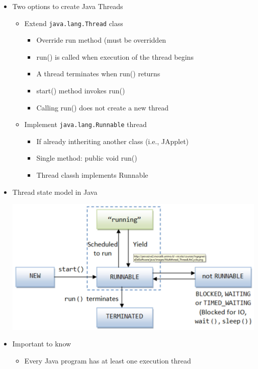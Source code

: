 \documentclass[a4paper]{article}
\newcommand{\inline}[1]{\lstinline!#1!}%
\begin{document}
\begin{itemize}
\begin{center}
			\end{center}
		\item Two options to create Java Threads
			\begin{itemize}
				\item Extend \inline{java.lang.Thread} class
					\begin{itemize}
						\item Override run method (must be overridden
						\item run() is called when execution of the thread begins
						\item A thread terminates when run() returns
						\item start() method invokes run()
						\item Calling run() does not create a new thread
					\end{itemize}
				\item Implement \inline{java.lang.Runnable} thread
					\begin{itemize}
						\item If already intheriting another class (i.e., JApplet)
						\item Single method: public void run()
						\item Thread classh implements Runnable
					\end{itemize}
			\end{itemize}
		\item Thread state model in Java
			\begin{center}
				\includegraphics[scale=1]{Figures/ThreadStateModelInJava.jpg}
			\end{center}
		\item Important to know
			\begin{itemize}
				\item Every Java program has at least one execution thread
					\begin{itemize}

\end{itemize}
\end{itemize}
\end{itemize}
\end{document}
